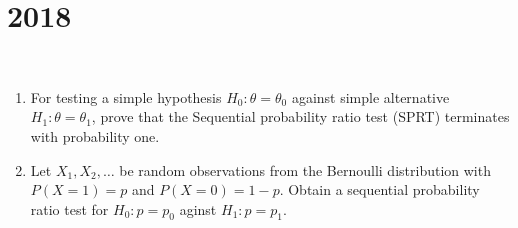 \section*{2018}
\vspace{-.5cm}
\hrulefill \smallskip\\
\begin{enumerate}[topsep=0pt, itemsep = -1ex,label=(\roman*)]
    \item For testing a simple hypothesis $H_0: \theta = \theta_0$ against simple alternative $H_1: \theta = \theta_1$, prove that the Sequential probability ratio test (SPRT) terminates with probability one.
    \item Let $X_1,X_2,\ldots$ be random observations from the Bernoulli distribution with $P(X=1) = p$ and $P(X=0)=1-p$. Obtain a sequential probability ratio test for $H_0:p = p_0$ aginst $H_1:p=p_1$.
\end{enumerate}